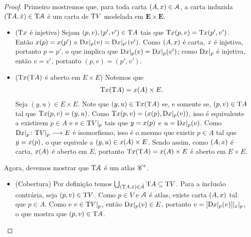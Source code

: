 \begin{proof}
Primeiro mostremos que, para toda carta $(A,x) \in \mathcal{A}$, a carta induzida $(\mathrm{T} A, \bar x) \in \mathrm{T} \mathcal{A}$ é um carta de $\mathrm{T} V$ modelada em $\bm E \times \bm E$.
	\begin{itemize}
		\item ($\mathrm{T} x$ é injetiva) Sejam $(p,v), (p',v') \in \mathrm{T} A$ tais que $\mathrm{T} x(p, v) = \mathrm{T} x(p', v')$. Então $x(p) = x(p')$ e $\mathrm{D} x|_p(v) = \mathrm{D} x|_{p'}(v')$. Como $(A,x)$ é carta, $x$ é injetiva, portanto $p = p'$, o que implica que $\mathrm{D} x|_p(v) = \mathrm{D} x|_p(v')$; como $\mathrm{D} x|_p$ é injetiva, então $v=v'$, portanto $(p,v) = (p',v')$.
		
		\item ($\mathrm{T} x(\mathrm{T} A)$ é aberto em $E \times E$) Notemos que
			\begin{equation*}
			\mathrm{T} x(\mathrm{T} A) = x(A) \times E.
			\end{equation*}
		Seja $(y,u) \in E \times E$. Note que $(y, u) \in \mathrm{T} x(\mathrm{T} A)$ se, e somente se, $(p,v) \in \mathrm{T} A$ tal que $\mathrm{T} x(p,v) = (y,u)$. Como $\mathrm{T} x(p,v) = (x(p), \mathrm{D}x|_p(v))$, isso é equivalente a existirem $p \in A$ e $v \in \mathrm{T} V|_p$ tais que $y = x(p)$ e $u = \mathrm{D}x|_p(v)$. Como $\mathrm{D} x|_p\colon \allowbreak \mathrm{T} V|_p \longrightarrow E$ é isomorfismo, isso é o mesmo que existir $p \in A$ tal que $y=x(p)$, o que equivale a $(y,u) \in x(A) \times E$.
%		
		Sendo assim, como $(A, x)$ é carta, $x(A)$ é aberto em $E$, portanto $\mathrm{T} x(\mathrm{T} A) = x(A) \times E$ é aberto em $E \times E$.
	\end{itemize}

Agora, devemos mostrar que $\mathrm{T} \mathcal{A}$ é um atlas $\mathscr{C}^r$.
	\begin{itemize}
	\item (Cobertura) Por definição temos $\bigcup_{(\mathrm{T} A,\bar x) \in \bar {\mathcal{A}}} \mathrm{T} A \subseteq \mathrm{T} V$. Para a inclusão contrária, seja $(p, v) \in \mathrm{T} V$. Como $p \in V$ e $\mathcal{A}$ é atlas, existe carta $(A, x)$ tal que $p \in A$. Como e $v \in \mathrm{T} V|_p$, então $\mathrm{D} x|_p(v) \in E$, portanto $v = [\mathrm{D} x|_p(v)]|_{x}|_p$, o que mostra que $(p,v) \in \mathrm{T} A$.	
	

\end{itemize}
\end{proof}

